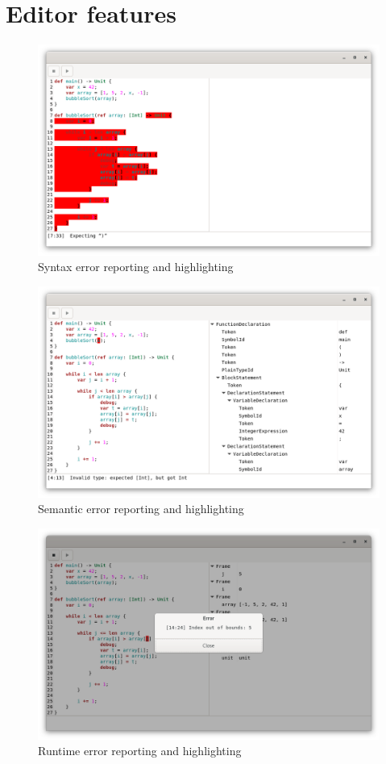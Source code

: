 \documentclass[11pt, american, draft]{PhdThesis}
\begin{document}
  \section{Editor features}

  \begin{figure}[H]
    \center
    \includegraphics[width=0.9\linewidth]{3.png}
    \caption{Syntax error reporting and highlighting}
    \label{ex5}
  \end{figure}

  \begin{figure}[H]
    \center
    \includegraphics[width=0.9\linewidth]{4.png}
    \caption{Semantic error reporting and highlighting}
    \label{ex6}
  \end{figure}

  \begin{figure}[H]
    \center
    \includegraphics[width=0.9\linewidth]{6.png}
    \caption{Runtime error reporting and highlighting}
    \label{ex7}
  \end{figure}
\end{document}
